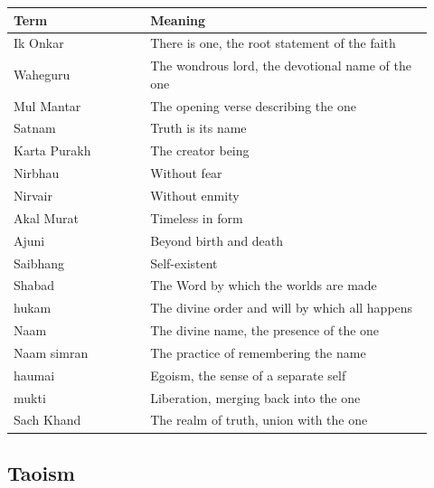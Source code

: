 \begin{longtable}{L{0.30\linewidth} L{0.62\linewidth}}
\toprule
\textbf{Term} & \textbf{Meaning} \\
\midrule
\endhead
Ik Onkar & There is one, the root statement of the faith \\
Waheguru & The wondrous lord, the devotional name of the one \\
Mul Mantar & The opening verse describing the one \\
Satnam & Truth is its name \\
Karta Purakh & The creator being \\
Nirbhau & Without fear \\
Nirvair & Without enmity \\
Akal Murat & Timeless in form \\
Ajuni & Beyond birth and death \\
Saibhang & Self-existent \\
Shabad & The Word by which the worlds are made \\
hukam & The divine order and will by which all happens \\
Naam & The divine name, the presence of the one \\
Naam simran & The practice of remembering the name \\
haumai & Egoism, the sense of a separate self \\
mukti & Liberation, merging back into the one \\
Sach Khand & The realm of truth, union with the one \\
\bottomrule
\end{longtable}

\subsection{Taoism}

